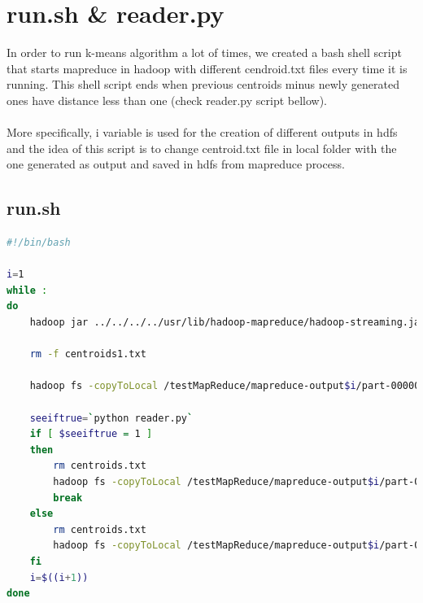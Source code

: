 
\section{run.sh \& reader.py}
In order to run k-means algorithm a lot of times, we created a bash shell script that starts mapreduce in hadoop with different cendroid.txt files every time it is running. This shell script ends when previous centroids minus newly generated ones have distance less than one (check reader.py script bellow). \\\\
More specifically, i variable is used for the creation of different outputs in hdfs and the idea of this script is to change centroid.txt file in local folder with the one generated as output and saved in hdfs from mapreduce process.
\newpage
\subsection{run.sh}
\begin{lstlisting}[language=bash]
#!/bin/bash

i=1
while :
do
	hadoop jar ../../../../usr/lib/hadoop-mapreduce/hadoop-streaming.jar -file centroids.txt -file ./mapper.py -mapper ./mapper.py -file ./reducer.py -reducer ./reducer.py -input /testMapReduce/dataset -output /testMapReduce/mapreduce-output$i
		
	rm -f centroids1.txt

	hadoop fs -copyToLocal /testMapReduce/mapreduce-output$i/part-00000 centroids1.txt

	seeiftrue=`python reader.py`
	if [ $seeiftrue = 1 ]
	then
		rm centroids.txt
		hadoop fs -copyToLocal /testMapReduce/mapreduce-output$i/part-00000 centroids.txt
		break
	else
		rm centroids.txt
		hadoop fs -copyToLocal /testMapReduce/mapreduce-output$i/part-00000 centroids.txt
	fi
	i=$((i+1))
done	
\end{lstlisting}


